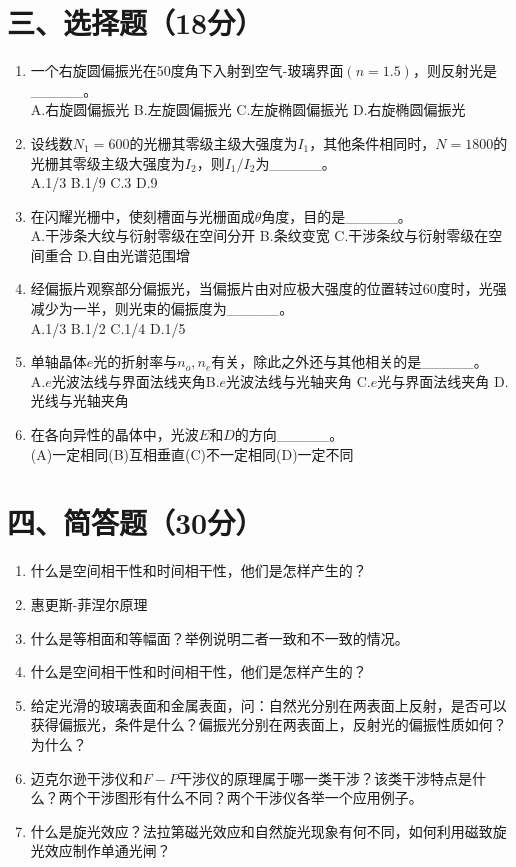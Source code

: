 \documentclass[12pt, a4paper]{article}
\theoremstyle{solution}
\begin{document}
\section*{三、选择题（18分）}
\begin{enumerate}
    \item 一个右旋圆偏振光在50度角下入射到空气-玻璃界面$(n=1.5)$，则反射光是\_\_\_\_\_。\\
    A.右旋圆偏振光 \quad B.左旋圆偏振光 \quad C.左旋椭圆偏振光 \quad D.右旋椭圆偏振光
    \item 设线数$N_1=600$的光栅其零级主级大强度为$I_1$，其他条件相同时，$N=1800$的光栅其零级主级大强度为$I_2$，则$I_1/I_2$为\_\_\_\_\_。\\
    A.1/3 \quad B.1/9 \quad C.3 \quad D.9
    \item 在闪耀光栅中，使刻槽面与光栅面成$\theta $角度，目的是\_\_\_\_\_。\\
    A.干涉条大纹与衍射零级在空间分开 \quad B.条纹变宽 \quad C.干涉条纹与衍射零级在空间重合 \quad D.自由光谱范围增
    \item 经偏振片观察部分偏振光，当偏振片由对应极大强度的位置转过60度时，光强减少为一半，则光束的偏振度为\_\_\_\_\_。\\
    A.1/3 \quad B.1/2 \quad C.1/4 \quad D.1/5
    \item 单轴晶体$e$光的折射率与$n_o,n_e$有关，除此之外还与其他相关的是\_\_\_\_\_。\\
    A.$e$光波法线与界面法线夹角\quad B.$e$光波法线与光轴夹角 \quad C.$e$光与界面法线夹角 \quad D.光线与光轴夹角
    \item 在各向异性的晶体中，光波$E$和$D$的方向\_\_\_\_\_。\\(A)一定相同\quad(B)互相垂直\quad(C)不一定相同\quad(D)一定不同
\end{enumerate}
\section*{四、简答题（30分）}
\begin{enumerate}
    \item 什么是空间相干性和时间相干性，他们是怎样产生的？
    \item 惠更斯-菲涅尔原理
    \item 什么是等相面和等幅面？举例说明二者一致和不一致的情况。
    \item 什么是空间相干性和时间相干性，他们是怎样产生的？
    \item 给定光滑的玻璃表面和金属表面，问：自然光分别在两表面上反射，是否可以获得偏振光，条件是什么？偏振光分别在两表面上，反射光的偏振性质如何？为什么？
    \item 迈克尔逊干涉仪和$F-P$干涉仪的原理属于哪一类干涉？该类干涉特点是什么？两个干涉图形有什么不同？两个干涉仪各举一个应用例子。
    \item 什么是旋光效应？法拉第磁光效应和自然旋光现象有何不同，如何利用磁致旋光效应制作单通光闸？
\end{enumerate}
\end{document}
